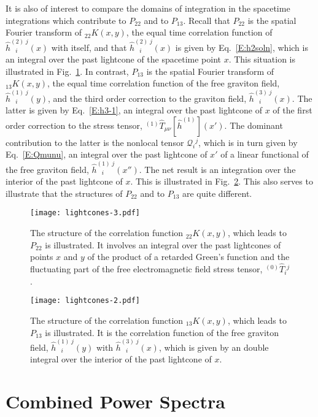 \documentclass[preprint,prd,showpacs,superscriptaddress]{revtex4}
\begin{document}
It is also of interest to compare the domains of integration in the spacetime integrations which contribute to  $P_{22}$ and to $P_{13}$.
Recall that $P_{22}$ is the spatial Fourier transform of ${}_{22}K(x,y)$,  the equal time correlation function of $\hat{h}^{(2)\;j}_{\;\;\; i}(x)$ 
with itself, and that  $\hat{h}^{(2)\;j}_{\;\;\; i}(x)$ is given by Eq.~\eqref{E:h2soln}, which is an integral over the past lightcone of the spacetime point
$x$. This situation is illustrated in Fig.~\ref{fig:P22}. In contrast,  $P_{13}$ is the spatial Fourier transform of  ${}_{13}K(x,y)$, the equal time 
correlation function of the free graviton field, $\hat{h}^{(1)\;j}_{\;\;\; i}(y)$, and the third order correction to the graviton field, 
$\hat{h}^{(3)\;j}_{\;\;\; i}(x)$. The latter is given by Eq.~\eqref{E:h3-1}, an integral over the past lightcone of $x$ of the first order
correction to the stress tensor, ${}^{(1)}\hat{T}_{\mu\nu}[\hat{h}^{(1)}](x')$. The dominant contribution to the latter is the nonlocal
tensor $\mathcal{Q}_{i}{}^{j}$, which is in turn given by Eq.~\eqref{E:Qmunu}, an integral over the past lightcone of $x'$ of a linear
functional of the free graviton field,  $\hat{h}^{(1)\;j}_{\;\;\; i}(x'')$. The net result is an integration over the interior of the past lightcone 
of $x$. This is illustrated in Fig.~\ref{fig:P13}. This also serves to illustrate that the structures of  $P_{22}$ and to $P_{13}$ are quite
different.
\begin{figure}[htbp]
	\centering
		\texttt{[image: lightcones-3.pdf]}
		\caption{ The structure of the correlation function ${}_{22}K(x,y)$, which leads to  $P_{22}$ is illustrated. It involves an integral over the 
		past lightcones
		of points $x$ and $y$ of the product of a retarded Green's function and the fluctuating part of the free electromagnetic field stress
		tensor, ${}^{(0)}\hat{T}_{i}{}^{j}$.}
	\label{fig:P22}
\end{figure}
\begin{figure}[htbp]
	\centering
		\texttt{[image: lightcones-2.pdf]}
		\caption{The structure of the correlation function ${}_{13}K(x,y)$, which leads to  $P_{13}$ is illustrated. It is the correlation function
		of the free graviton field, $\hat{h}^{(1)\;j}_{\;\;\; i}(y)$ with $\hat{h}^{(3)\;j}_{\;\;\; i}(x)$, which is given by an double integral over the 
		interior of the past lightcone of $x$.   }
	\label{fig:P13}
\end{figure}



\section{Combined Power Spectra}
\label{S:combined}
\end{document}
